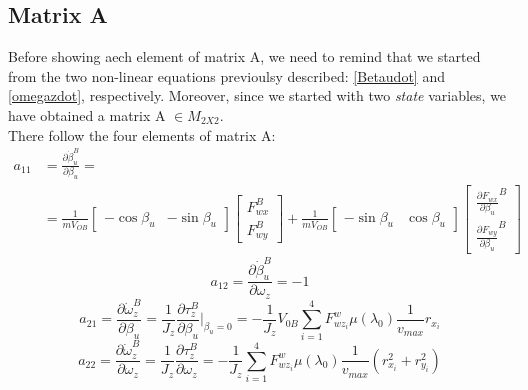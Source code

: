 \documentclass[a4paper,12pt,titlepage]{report}
\begin{document}
	\subsection{Matrix A}
		Before showing aech element of matrix A, we  need to remind that we started from the two non-linear equations previoulsy described: \ref{Betaudot} and \ref{omegazdot}, respectively. Moreover, since we started with two \textit{state} variables, we have obtained a matrix A $\in M_{2X2}$.\\ There follow the four elements of matrix A:
			\begin{equation} \label{a11}
				\begin{split}
					a_{11} &= \frac{\partial\dot{\beta}_{u}^{B}}{\partial\beta_{u}} = \\ 
					&= \frac{1}{mV_{OB}}
					\begin{bmatrix}
					- \cos\beta_{u} & -\sin\beta_{u}
					\end{bmatrix}
					\begin{bmatrix}
					F_{wx}^{B} \\ F_{wy}^{B}
					\end{bmatrix}
					+ \frac{1}{mV_{OB}} 
					\begin{bmatrix}
					- \sin\beta_{u} & \cos\beta_{u}
					\end{bmatrix}
					\begin{bmatrix}
					\frac{\partial F_{wx}}{\partial\beta_{u}}^{B} \\ \frac{\partial F_{wy}}{\partial\beta_{u}}^{B}
					\end{bmatrix}
				\end{split}
			\end{equation} 
			\begin{equation} \label{a12}
				a_{12} = \frac{\partial\dot{\beta}_{u}^{B}}{\partial\omega_{z}} = -1
			\end{equation} 
			\begin{equation} \label{a21}
				a_{21} = \frac{\partial\dot{\omega}_{z}^{B}}{\partial\beta_{u}} = \frac{1}{J_{z}} \frac{\partial\tau_{z}^{B}}{\partial\beta_{u}} \vert_{\beta_{u}=0} = -\frac{1}{J_{z}} V_{0B} \sum\limits_{i=1}^4 F_{wz_{i}}^{w} \mu(\lambda_{0}) \frac{1}{v_{max}}r_{x_{i}}
			\end{equation}
			\begin{equation} \label{a22}
				a_{22} = \frac{\partial\dot{\omega}_{z}^{B}}{\partial\omega_{z}} = \frac{1}{J_{z}} \frac{\partial\tau_{z}^{B}}{\partial\omega_{z}} = -\frac{1}{J_{z}}\sum\limits_{i=1}^4 F_{wz_{i}}^{w} \mu(\lambda_{0}) \frac{1}{v_{max}} (r_{x_{i}}^{2} + r_{y_{i}}^{2}) 
			\end{equation}
\end{document}
